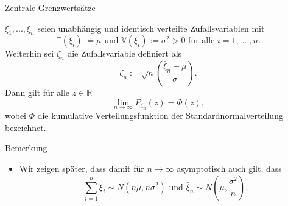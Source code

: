 \documentclass[
  8pt,
  ignorenonframetext,
]{beamer}
\providecommand{\tightlist}{%
  \setlength{\itemsep}{0pt}\setlength{\parskip}{0pt}}
\begin{document}
\begin{frame}{Zentrale Grenzwertsätze}
\protect\hypertarget{zentrale-grenzwertsuxe4tze-2}{}
\footnotesize
\begin{theorem}
\justifying
\normalfont
$\xi_1,...,\xi_n$ seien unabhängig und identisch verteilte Zufallsvariablen mit
\begin{equation}
\mathbb{E}(\xi_i) := \mu \mbox{ und }
\mathbb{V}(\xi_i) := \sigma^2 > 0
\mbox{ für alle } i = 1,....,n.
\end{equation}
Weiterhin sei $\zeta_n$ die Zufallsvariable definiert als
\begin{equation}
\zeta_n := \sqrt{n}\left(\frac{\bar{\xi}_n - \mu}{\sigma}\right).
\end{equation}
Dann gilt für alle $z \in \mathbb{R}$
\begin{equation}
\lim_{n \to \infty} P_{\zeta_n}(z) = \Phi(z),
\end{equation}
wobei $\Phi$ die kumulative Verteilungsfunktion der Standardnormalverteilung bezeichnet.
\end{theorem}

\footnotesize

Bemerkung

\begin{itemize}
\tightlist
\item
  Wir zeigen später, dass damit für \(n\to\infty\) asymptotisch auch
  gilt, dass \begin{equation}
  \sum_{i=1}^n \xi_i \sim N(n\mu, n\sigma^2)
  \mbox{ und }
  \bar{\xi}_n \sim N\left(\mu,\frac{\sigma^2}{n}\right).
  \end{equation}
\end{itemize}
\end{frame}
\end{document}
